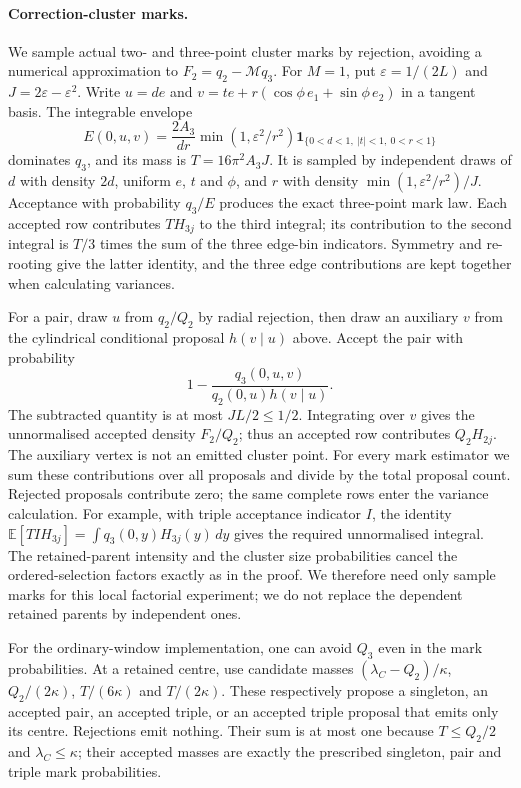 \documentclass[11pt,a4paper]{article}
\numberwithin{equation}{section}
\theoremstyle{definition}
\theoremstyle{remark}
\newcommand{\E}{\mathbb E}
\begin{document}
\paragraph{Correction-cluster marks.}
We sample actual two- and three-point cluster marks by rejection, avoiding
a numerical approximation to $F_2=q_2-\mathcal Mq_3$. For $M=1$, put
$\varepsilon=1/(2L)$ and $J=2\varepsilon-\varepsilon^2$. Write
$u=de$ and $v=te+r(\cos\phi\,e_1+\sin\phi\,e_2)$ in a tangent basis.
The integrable envelope
\[
 E(0,u,v)=\frac{2A_3}{dr}\min(1,\varepsilon^2/r^2)
      \mathbf1_{\{0<d<1,\ |t|<1,\ 0<r<1\}}
\]
dominates $q_3$, and its mass is $T=16\pi^2A_3J$.
It is sampled by independent draws of $d$ with density $2d$, uniform $e$,
$t$ and $\phi$, and $r$ with density
$\min(1,\varepsilon^2/r^2)/J$. Acceptance with probability $q_3/E$
produces the exact three-point mark law. Each accepted row contributes
$TH_{3j}$ to the third integral; its contribution to the second integral
is $T/3$ times the sum of the three edge-bin indicators. Symmetry and
re-rooting give the latter identity, and the three edge contributions are
kept together when calculating variances.

For a pair, draw $u$ from $q_2/Q_2$ by radial rejection, then draw an auxiliary
$v$ from the cylindrical conditional proposal $h(v\mid u)$ above. Accept
the pair with probability
\[
 1-\frac{q_3(0,u,v)}{q_2(0,u)h(v\mid u)}.
\]
The subtracted quantity is at most $JL/2\leq1/2$. Integrating over $v$ gives
the unnormalised accepted density $F_2/Q_2$; thus an accepted row contributes
$Q_2H_{2j}$. The auxiliary vertex is not an emitted cluster point.
For every mark estimator we sum these contributions over all proposals
and divide by the total proposal count. Rejected proposals contribute zero;
the same complete rows enter the variance calculation. For example, with
triple acceptance indicator $I$, the identity
$\E[TIH_{3j}]=\int q_3(0,y)H_{3j}(y)\,dy$
gives the required unnormalised integral.
The retained-parent intensity and the cluster size probabilities cancel
the ordered-selection factors exactly as in the proof. We therefore need
only sample marks for this local factorial experiment; we do not replace
the dependent retained parents by independent ones.

For the ordinary-window implementation, one can avoid $Q_3$ even in the
mark probabilities. At a retained centre, use candidate masses
$(\lambda_C-Q_2)/\kappa$, $Q_2/(2\kappa)$, $T/(6\kappa)$ and
$T/(2\kappa)$. These respectively propose a singleton, an accepted pair,
an accepted triple, or an accepted triple proposal that emits only its
centre. Rejections emit nothing. Their sum is at most one because
$T\leq Q_2/2$ and $\lambda_C\leq\kappa$; their accepted masses are exactly
the prescribed singleton, pair and triple mark probabilities.
\end{document}
